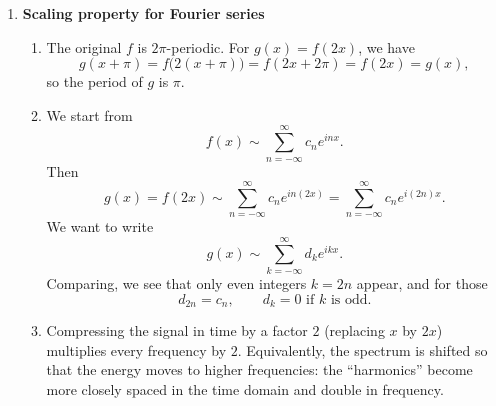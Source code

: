 \documentclass[11pt]{article}
\begin{document}
\begin{enumerate}
\begin{enumerate}
\item Since $f$ is odd, we have $a_0=0$ and $a_n=0$ for all $n$, and the Fourier series reduces to
\[
f(x)\sim \sum_{n=1}^{\infty} b_n \sin(nx).
\]

\item For $n\ge 1$,
\[
b_n = \frac{1}{\pi}\int_{-\pi}^{\pi} f(x)\sin(nx)\,dx.
\]
Because $f$ and $\sin(nx)$ are both odd, their product is even, so
\[
b_n = \frac{2}{\pi}\int_{0}^{\pi} f(x)\sin(nx)\,dx
     = \frac{2}{\pi}\int_{0}^{\pi} 1\cdot \sin(nx)\,dx.
\]
Compute
\[
\int_{0}^{\pi} \sin(nx)\,dx
= \left[-\frac{\cos(nx)}{n}\right]_{0}^{\pi}
= -\frac{\cos(n\pi)-\cos(0)}{n}
= -\frac{(-1)^n-1}{n}
= \frac{1-(-1)^n}{n}.
\]
Hence
\[
b_n = \frac{2}{\pi}\cdot \frac{1-(-1)^n}{n}.
\]
We see that:
\[
b_n =
\begin{cases}
0 & \text{if } n \text{ is even (then }1-(-1)^n=0),\\[4pt]
\displaystyle \frac{4}{\pi n} & \text{if }n\text{ is odd (then }1-(-1)^n=2).
\end{cases}
\]
So
\[
f(x) \sim \sum_{\substack{n=1 \\ n\ \text{odd}}}^{\infty} \frac{4}{\pi n} \sin(nx)
= \frac{4}{\pi}\left(\sin x + \frac{1}{3}\sin 3x + \frac{1}{5}\sin 5x + \cdots\right).
\]
\end{enumerate}

\bigskip
\item \textbf{Scaling property for Fourier series}

\begin{enumerate}
\item The original $f$ is $2\pi$-periodic. For $g(x)=f(2x)$, we have
\[
g(x+\pi) = f\big(2(x+\pi)\big)=f(2x+2\pi)=f(2x)=g(x),
\]
so the period of $g$ is $\pi$.

\item We start from
\[
f(x)\sim \sum_{n=-\infty}^{\infty} c_n e^{inx}.
\]
Then
\[
g(x)=f(2x) \sim \sum_{n=-\infty}^{\infty} c_n e^{in(2x)} = \sum_{n=-\infty}^{\infty} c_n e^{i(2n)x}.
\]
We want to write
\[
g(x)\sim \sum_{k=-\infty}^{\infty} d_k e^{ikx}.
\]
Comparing, we see that only even integers $k=2n$ appear, and for those
\[
d_{2n}=c_n,\qquad d_k=0 \text{ if }k\text{ is odd}.
\]

\item Compressing the signal in time by a factor $2$ (replacing $x$ by $2x$) multiplies every frequency by $2$. Equivalently, the spectrum is shifted so that the energy moves to higher frequencies: the ``harmonics'' become more closely spaced in the time domain and double in frequency.
\end{enumerate}


\end{enumerate}
\end{document}
